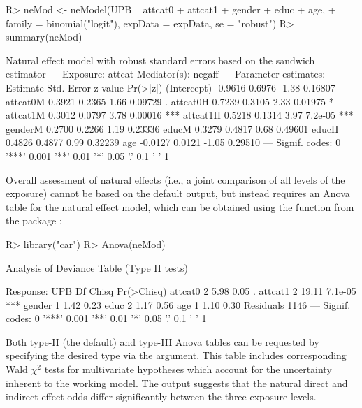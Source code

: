 \documentclass[nojss]{jss}
\begin{document}
\begin{Schunk}
\begin{Sinput}
R> neMod <- neModel(UPB ~ attcat0 + attcat1 + gender + educ + age,
+    family = binomial("logit"), expData = expData, se = "robust")
R> summary(neMod)
\end{Sinput}
\begin{Soutput}
Natural effect model
with robust standard errors based on the sandwich estimator
---
Exposure: attcat 
Mediator(s): negaff 
---
Parameter estimates:
            Estimate Std. Error z value Pr(>|z|)    
(Intercept)  -0.9616     0.6976   -1.38  0.16807    
attcat0M      0.3921     0.2365    1.66  0.09729 .  
attcat0H      0.7239     0.3105    2.33  0.01975 *  
attcat1M      0.3012     0.0797    3.78  0.00016 ***
attcat1H      0.5218     0.1314    3.97  7.2e-05 ***
genderM       0.2700     0.2266    1.19  0.23336    
educM         0.3279     0.4817    0.68  0.49601    
educH         0.4826     0.4877    0.99  0.32239    
age          -0.0127     0.0121   -1.05  0.29510    
---
Signif. codes:  0 '***' 0.001 '**' 0.01 '*' 0.05 '.' 0.1 ' ' 1
\end{Soutput}
\end{Schunk}
Overall assessment of natural effects (i.e., a joint comparison of all levels of the exposure) cannot be based on the default  output, but instead requires an Anova table for the natural effect model, which can be obtained using the  function from the  package \citep{R:car}:
\begin{Schunk}
\begin{Sinput}
R> library("car")
R> Anova(neMod)
\end{Sinput}
\begin{Soutput}
Analysis of Deviance Table (Type II tests)

Response: UPB
            Df Chisq Pr(>Chisq)    
attcat0      2  5.98       0.05 .  
attcat1      2 19.11    7.1e-05 ***
gender       1  1.42       0.23    
educ         2  1.17       0.56    
age          1  1.10       0.30    
Residuals 1146                     
---
Signif. codes:  0 '***' 0.001 '**' 0.01 '*' 0.05 '.' 0.1 ' ' 1
\end{Soutput}
\end{Schunk}
Both type-II (the default) and type-III Anova tables can be requested by specifying the desired type via the  argument. This table includes corresponding Wald $\chi^2$ tests for multivariate hypotheses which account for the uncertainty inherent to the working model. The output suggests that the natural direct and indirect effect odds differ significantly between the three exposure levels. 
\end{document}
